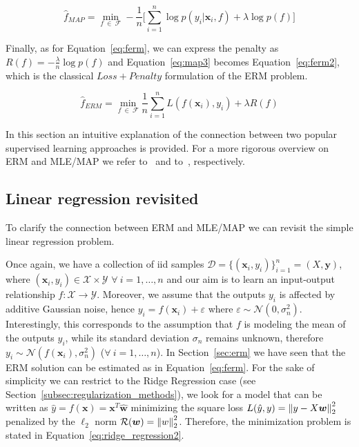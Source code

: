 \begin{equation} \label{eq:map3}
	\hat f_{MAP} = \min_{f~\in~\mathcal{F}} - \frac{1}{n} \bigg[ \sum_{i=1}^n \log p(y_i|\bm{x}_i,f) + \lambda \log p(f) \bigg]
\end{equation}

Finally, as for Equation~\eqref{eq:ferm}, we can express the penalty as $R(f) = - \frac{\lambda}{n} \log p(f)$ and Equation~\eqref{eq:map3} becomes Equation~\eqref{eq:ferm2}, which is the classical $Loss + Penalty$ formulation of the ERM problem.

\begin{equation} \label{eq:ferm2}
	\hat f_{ERM} = \min_{f~\in~\mathcal{F}} \frac{1}{n} \sum_{i=1}^n L(f(\bm{x}_i), y_i) + \lambda R(f)
\end{equation}

In this section an intuitive explanation of the connection between two popular supervised learning approaches is provided. For a more rigorous overview on ERM and MLE/MAP we refer to~\cite{hastie2009elements} and to~\cite{rasmussen2006gaussian}, respectively.

\subsection{Linear regression revisited} \label{subsec:linear_regression_revisited}

To clarify the connection between ERM and MLE/MAP we can revisit the simple linear regression problem.

Once again, we have a collection of \ac{iid} samples $\mathcal{D}=\{(\bm{x}_i,y_i)\}_{i=1}^n = (X, \bm{y})$, where $(\bm{x}_i,y_i) \in \mathcal{X} \times \mathcal{Y}$ $\forall~i=1,\dots,n$ and our aim is to learn an input-output relationship $f: \mathcal{X} \rightarrow \mathcal{Y}$.
Moreover, we assume that the outputs $y_i$ is affected by additive Gaussian noise, hence $y_i = f(\bm{x}_i) + \varepsilon$ where $\varepsilon \sim \mathcal{N}(0,\sigma_n^2)$.
Interestingly, this corresponds to the assumption that $f$ is modeling the mean of the outputs $y_i$, while its standard deviation $\sigma_n$ remains unknown, therefore $y_i \sim \mathcal{N}(f(\bm{x}_i), \sigma_n^2)$ ($\forall~i=1,\dots,n$).
In Section~\ref{sec:erm} we have seen that the ERM solution can be estimated as in Equation~\ref{eq:ferm}. For the sake of simplicity we can restrict to the Ridge Regression  case (see Section~\ref{subsec:regularization_methods}), \ie we look for a model that can be written as $\hat y = f(\bm{x}) = \bm{x}^T \bm{ \hat w}$ minimizing the square loss $L(\hat y,y) = \left\lVert y - X\bm{w}\right\rVert_2^2$ penalized by the $\ell_2$ norm $\mathcal{R}(\bm{w}) = \left\lVert w\right\rVert_2^2$.
Therefore, the minimization problem is stated in Equation~\eqref{eq:ridge_regression2}.

